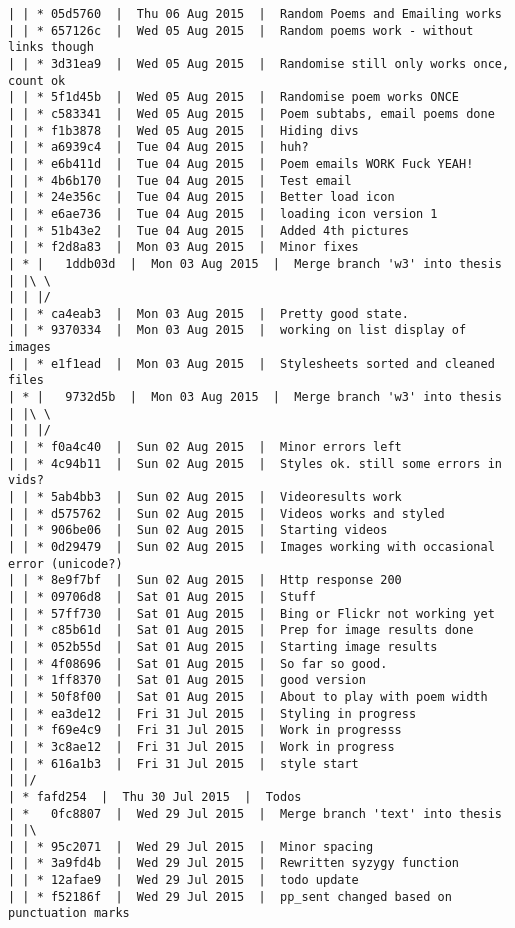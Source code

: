 \begin{verbatim}
| | * 05d5760  |  Thu 06 Aug 2015  |  Random Poems and Emailing works
| | * 657126c  |  Wed 05 Aug 2015  |  Random poems work - without links though
| | * 3d31ea9  |  Wed 05 Aug 2015  |  Randomise still only works once, count ok
| | * 5f1d45b  |  Wed 05 Aug 2015  |  Randomise poem works ONCE
| | * c583341  |  Wed 05 Aug 2015  |  Poem subtabs, email poems done
| | * f1b3878  |  Wed 05 Aug 2015  |  Hiding divs
| | * a6939c4  |  Tue 04 Aug 2015  |  huh?
| | * e6b411d  |  Tue 04 Aug 2015  |  Poem emails WORK Fuck YEAH!
| | * 4b6b170  |  Tue 04 Aug 2015  |  Test email
| | * 24e356c  |  Tue 04 Aug 2015  |  Better load icon
| | * e6ae736  |  Tue 04 Aug 2015  |  loading icon version 1
| | * 51b43e2  |  Tue 04 Aug 2015  |  Added 4th pictures
| | * f2d8a83  |  Mon 03 Aug 2015  |  Minor fixes
| * |   1ddb03d  |  Mon 03 Aug 2015  |  Merge branch 'w3' into thesis
| |\ \  
| | |/  
| | * ca4eab3  |  Mon 03 Aug 2015  |  Pretty good state.
| | * 9370334  |  Mon 03 Aug 2015  |  working on list display of images
| | * e1f1ead  |  Mon 03 Aug 2015  |  Stylesheets sorted and cleaned files
| * |   9732d5b  |  Mon 03 Aug 2015  |  Merge branch 'w3' into thesis
| |\ \  
| | |/  
| | * f0a4c40  |  Sun 02 Aug 2015  |  Minor errors left
| | * 4c94b11  |  Sun 02 Aug 2015  |  Styles ok. still some errors in vids?
| | * 5ab4bb3  |  Sun 02 Aug 2015  |  Videoresults work
| | * d575762  |  Sun 02 Aug 2015  |  Videos works and styled
| | * 906be06  |  Sun 02 Aug 2015  |  Starting videos
| | * 0d29479  |  Sun 02 Aug 2015  |  Images working with occasional error (unicode?)
| | * 8e9f7bf  |  Sun 02 Aug 2015  |  Http response 200
| | * 09706d8  |  Sat 01 Aug 2015  |  Stuff
| | * 57ff730  |  Sat 01 Aug 2015  |  Bing or Flickr not working yet
| | * c85b61d  |  Sat 01 Aug 2015  |  Prep for image results done
| | * 052b55d  |  Sat 01 Aug 2015  |  Starting image results
| | * 4f08696  |  Sat 01 Aug 2015  |  So far so good.
| | * 1ff8370  |  Sat 01 Aug 2015  |  good version
| | * 50f8f00  |  Sat 01 Aug 2015  |  About to play with poem width
| | * ea3de12  |  Fri 31 Jul 2015  |  Styling in progress
| | * f69e4c9  |  Fri 31 Jul 2015  |  Work in progresss
| | * 3c8ae12  |  Fri 31 Jul 2015  |  Work in progress
| | * 616a1b3  |  Fri 31 Jul 2015  |  style start
| |/  
| * fafd254  |  Thu 30 Jul 2015  |  Todos
| *   0fc8807  |  Wed 29 Jul 2015  |  Merge branch 'text' into thesis
| |\  
| | * 95c2071  |  Wed 29 Jul 2015  |  Minor spacing
| | * 3a9fd4b  |  Wed 29 Jul 2015  |  Rewritten syzygy function
| | * 12afae9  |  Wed 29 Jul 2015  |  todo update
| | * f52186f  |  Wed 29 Jul 2015  |  pp_sent changed based on punctuation marks

\end{verbatim}
